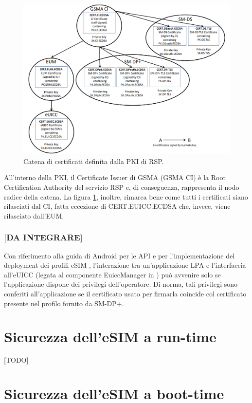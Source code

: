 \documentclass[10pt, twoside, openany]{book}
\begin{document}
\begin{figure}
\includegraphics[width=\linewidth]{cert-chain.png}
\caption{Catena di certificati definita dalla PKI di RSP.}
\label{fig:cert-chain}
\end{figure}
All'interno della PKI, il Certificate Issuer di GSMA (GSMA CI) è la Root Certification Authority del servizio RSP e, di conseguenza, rappresenta il nodo radice della catena. La figura \ref{fig:cert-chain}, inoltre, rimarca bene come tutti i certificati siano rilasciati dal CI, fatta eccezione di CERT.EUICC.ECDSA che, invece, viene rilasciato dall'EUM.

\subsection{[DA INTEGRARE]}
Con riferimento alla guida di Android per le API e per l'implementazione del deployment dei profili eSIM \cite{Android-docs}, l'interazione tra un'applicazione LPA e l'interfaccia all'eUICC (legata al componente EuiccManager in \cite{Android-docs}) può avvenire solo se l'applicazione dispone dei privilegi dell'operatore. Di norma, tali privilegi sono conferiti all'applicazione se il certificato usato per firmarla coincide col certificato presente nel profilo fornito da SM-DP+.

\chapter{Sicurezza dell'eSIM a run-time}
[TODO]

\chapter{Sicurezza dell'eSIM a boot-time}
\end{document}
